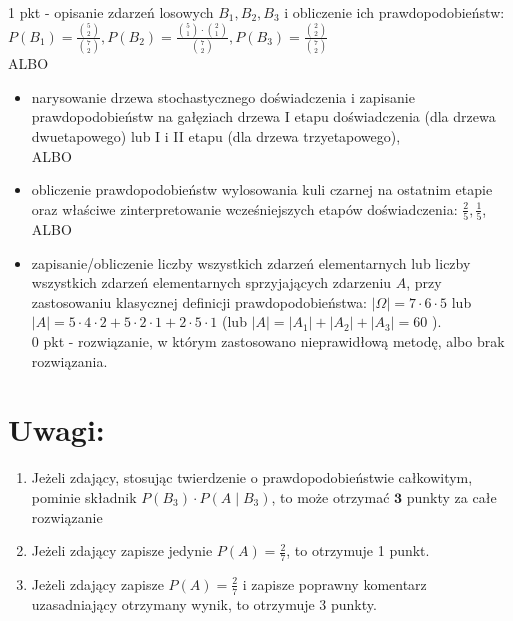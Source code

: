 \documentclass[10pt]{article}
\begin{document}
1 pkt - opisanie zdarzeń losowych $B_{1}, B_{2}, B_{3}$ i obliczenie ich prawdopodobieństw:\\
$P\left(B_{1}\right)=\frac{\binom{5}{2}}{\binom{7}{2}}, P\left(B_{2}\right)=\frac{\binom{5}{1} \cdot\binom{2}{1}}{\binom{7}{2}}, P\left(B_{3}\right)=\frac{\binom{2}{2}}{\binom{7}{2}}$\\
ALBO

\begin{itemize}
  \item narysowanie drzewa stochastycznego doświadczenia i zapisanie prawdopodobieństw na gałęziach drzewa I etapu doświadczenia (dla drzewa dwuetapowego) lub I i II etapu (dla drzewa trzyetapowego),\\
ALBO
  \item obliczenie prawdopodobieństw wylosowania kuli czarnej na ostatnim etapie oraz właściwe zinterpretowanie wcześniejszych etapów doświadczenia: $\frac{2}{5}, \frac{1}{5}$,\\
ALBO
  \item zapisanie/obliczenie liczby wszystkich zdarzeń elementarnych lub liczby wszystkich zdarzeń elementarnych sprzyjających zdarzeniu $A$, przy zastosowaniu klasycznej definicji prawdopodobieństwa: $|\Omega|=7 \cdot 6 \cdot 5$ lub\\
$|A|=5 \cdot 4 \cdot 2+5 \cdot 2 \cdot 1+2 \cdot 5 \cdot 1$ (lub $|A|=\left|A_{1}\right|+\left|A_{2}\right|+\left|A_{3}\right|=60$ ).\\
0 pkt - rozwiązanie, w którym zastosowano nieprawidłową metodę, albo brak rozwiązania.
\end{itemize}

\section*{Uwagi:}
\begin{enumerate}
  \item Jeżeli zdający, stosując twierdzenie o prawdopodobieństwie całkowitym, pominie składnik $P\left(B_{3}\right) \cdot P\left(A \mid B_{3}\right)$, to może otrzymać $\mathbf{3}$ punkty za całe rozwiązanie
  \item Jeżeli zdający zapisze jedynie $P(A)=\frac{2}{7}$, to otrzymuje 1 punkt.
  \item Jeżeli zdający zapisze $P(A)=\frac{2}{7}$ i zapisze poprawny komentarz uzasadniający otrzymany wynik, to otrzymuje 3 punkty.
\end{enumerate}
\end{document}
